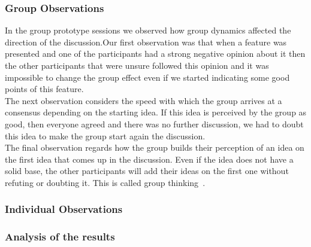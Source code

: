 \documentclass[main.tex]{subfiles}
\begin{document}
\subsubsection{Group Observations}

In the group prototype sessions we observed how group dynamics affected the direction of the discussion.Our first observation was that when a feature was presented and one of the participants had a strong negative opinion about it then the other participants that were unsure followed this opinion and it was impossible to change the group effect even if we started indicating some good points of this feature. \\

The next observation considers the speed with which the group arrives at a consensus depending on the starting idea. If this idea is perceived by the group as good, then everyone agreed and there was no further discussion, we had to doubt this idea to make the group start again the discussion.\\

The final observation regards how the group builds their perception of an idea on the first idea that comes up in the discussion. Even if the idea does not have a solid base, the other participants will add their ideas on the first one without refuting or doubting it. This is called group thinking~\cite{janis}.

\subsubsection{Individual Observations}

\subsubsection{Analysis of the results}
\end{document}
